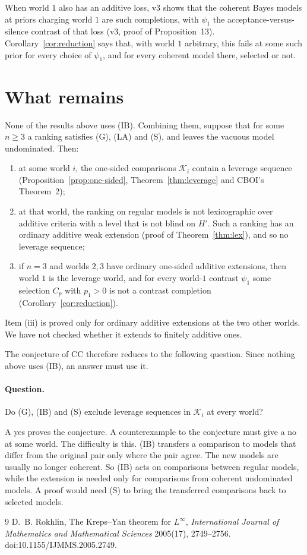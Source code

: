 \documentclass[11pt]{article}
\theoremstyle{remark}\newtheorem{remark}[theorem]{Remark}
\newcommand{\Kscr}{\mathcal K}
\begin{document}
When world $1$ also has an additive loss, v3 shows that the coherent Bayes
models at priors charging world $1$ are such completions, with $\psi_1$ the
acceptance-versus-silence contrast of that loss (v3, proof of
Proposition~13). Corollary~\ref{cor:reduction} says that, with world $1$
arbitrary, this fails at some such prior for every choice of $\psi_1$, and for
every coherent model there, selected or not.

\section{What remains}

None of the results above uses (IB). Combining them, suppose that for some
$n\ge3$ a ranking satisfies (G), (LA) and (S), and leaves the vacuous model
undominated. Then:
\begin{enumerate}[label=(\roman*),leftmargin=*,itemsep=2pt]
\item at some world $i$, the one-sided comparisons $\Kscr_i$ contain a
leverage sequence (Proposition~\ref{prop:one-sided},
Theorem~\ref{thm:leverage} and CBOI's Theorem~2);
\item at that world, the ranking on regular models is not lexicographic over
additive criteria with a level that is not blind on $H'$. Such a ranking has
an ordinary additive weak extension (proof of Theorem~\ref{thm:lex}), and so
no leverage sequence;
\item if $n=3$ and worlds $2,3$ have ordinary one-sided additive extensions,
then world $1$ is the leverage world, and for every world-$1$ contrast
$\psi_1$ some selection $C_p$ with $p_1>0$ is not a contrast completion
(Corollary~\ref{cor:reduction}).
\end{enumerate}
Item (iii) is proved only for ordinary additive extensions at the two other
worlds. We have not checked whether it extends to finitely additive ones.

The conjecture of CC therefore reduces to the following question. Since
nothing above uses (IB), an answer must use it.

\paragraph{Question.} Do (G), (IB) and (S) exclude leverage sequences in
$\Kscr_i$ at every world?

A yes proves the conjecture. A counterexample to the conjecture must give a
no at some world. The difficulty is this. (IB) transfers a comparison to
models that differ from the original pair only where the pair agree. The new
models are usually no longer coherent. So (IB) acts on comparisons between
regular models, while the extension is needed only for comparisons from
coherent undominated models. A proof would need (S) to bring the transferred
comparisons back to selected models.

\begin{thebibliography}{9}
 D.~B. Rokhlin, The Kreps--Yan theorem for $L^\infty$,
\emph{International Journal of Mathematics and Mathematical Sciences}
2005(17), 2749--2756. doi:10.1155/IJMMS.2005.2749.
\end{thebibliography}
\end{document}
